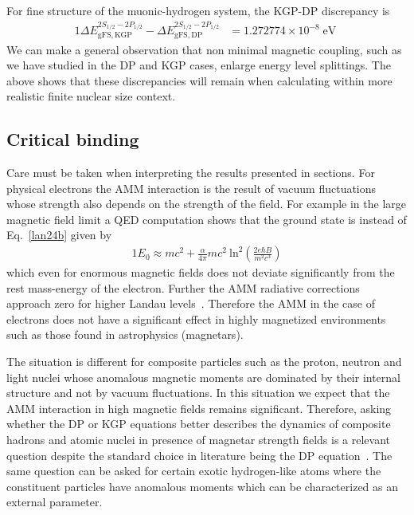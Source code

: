 For fine structure of the muonic-hydrogen system, the KGP-DP discrepancy is
\begin{alignat}{1}
\label{fs05} \Delta E_{\mathrm{gFS,KGP}}^{2S_{1/2}-2P_{1/2}}-\Delta E_{\mathrm{gFS,DP}}^{2S_{1/2}-2P_{1/2}}&=\!1.272774\times10^{-8}\;\mathrm{eV}\;
\end{alignat} 
We can make a general observation that non minimal magnetic coupling, such as we have studied in the DP and KGP cases, enlarge energy level splittings. The above shows that these discrepancies will remain when calculating within more realistic finite nuclear size context.

















\subsection{Critical binding} \label{sb}
Care must be taken when interpreting the results presented in sections. For physical electrons the AMM interaction is the result of vacuum fluctuations whose strength also depends on the strength of the field. For example in the large magnetic field limit a QED computation shows that the ground state is instead of Eq.~\eqref{lan24b} given by~\cite{Jancovici:1969exc}
\begin{alignat}{1} \label{vacfl01}
E_{0}\approx mc^{2}+\frac{\alpha}{4\pi}mc^{2}\ \mathrm{ln}^{2}\left(\frac{2e\hbar B}{m^{2}c^{3}}\right)
\end{alignat}
which even for enormous magnetic fields does not deviate significantly from the rest mass-energy of the electron. Further the AMM radiative corrections approach zero for higher Landau levels~\citep{Ferrer:2015wca}. Therefore the AMM in the case of electrons does not have a significant effect in highly magnetized environments such as those found in astrophysics (magnetars).

The situation is different for composite particles such as the proton, neutron and light nuclei whose anomalous magnetic moments are dominated by their internal structure and not by vacuum fluctuations. In this situation we expect that the AMM interaction in high magnetic fields remains significant. Therefore, asking whether the DP or KGP equations better describes the dynamics of composite hadrons and atomic nuclei in presence of magnetar strength fields is a relevant question despite the standard choice in literature being the DP equation~\cite{Broderick:2000pe}. The same question can be asked for certain exotic hydrogen-like atoms where the constituent particles have anomalous moments which can be characterized as an external parameter. 


